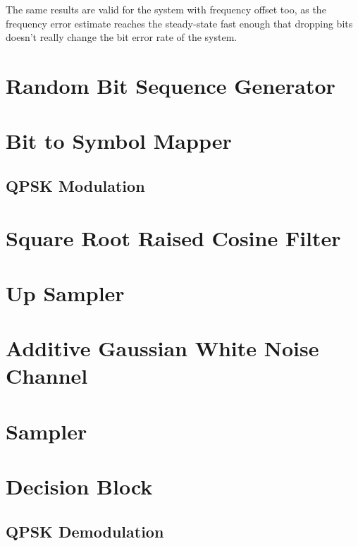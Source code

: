\documentclass[]{article}
\begin{document}
The same results are valid for the system with frequency offset too, as the frequency error estimate reaches the steady-state fast enough that dropping bits doesn't really change the bit error rate of the system. 

\appendix
\newpage


\newpage
%

\section{Random Bit Sequence Generator}
\label{app:random_bit_generator}


\section{Bit to Symbol Mapper}
\label{app:bittosym}

\subsection{QPSK Modulation}
\label{app:qpsk_mod}


\section{Square Root Raised Cosine Filter}
\label{app:sqrt_raised_cosine}


\section{Up Sampler}
\label{app:impulse_train}


\section{Additive Gaussian White Noise Channel}
\label{app:awgn_channel}


\section{Sampler}
\label{app:sampler}


\section{Decision Block}
\label{app:dblocks}
\subsection{QPSK Demodulation}
\label{app:qpsk_demod}

\end{document}
